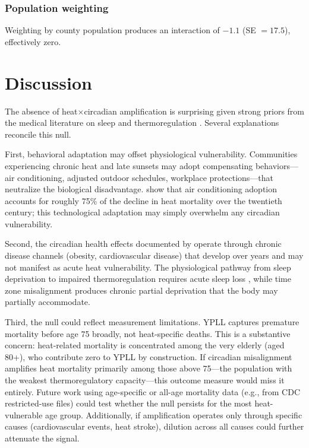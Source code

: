 \documentclass[12pt]{article}
\begin{document}
\subsubsection*{Population weighting} Weighting by county population produces an interaction of $-1.1$ (SE $= 17.5$), effectively zero.


\section{Discussion}
\label{sec:discussion}

The absence of heat$\times$circadian amplification is surprising given strong priors from the medical literature on sleep and thermoregulation \citep{lack2008sleep, okamoto2012effects}. Several explanations reconcile this null.

First, behavioral adaptation may offset physiological vulnerability. Communities experiencing chronic heat and late sunsets may adopt compensating behaviors---air conditioning, adjusted outdoor schedules, workplace protections---that neutralize the biological disadvantage. \citet{barreca2016adapting} show that air conditioning adoption accounts for roughly 75\% of the decline in heat mortality over the twentieth century; this technological adaptation may simply overwhelm any circadian vulnerability.

Second, the circadian health effects documented by \citet{giuntella2019sunset} operate through chronic disease channels (obesity, cardiovascular disease) that develop over years and may not manifest as acute heat vulnerability. The physiological pathway from sleep deprivation to impaired thermoregulation requires acute sleep loss \citep{okamoto2012effects}, while time zone misalignment produces chronic partial deprivation that the body may partially accommodate.

Third, the null could reflect measurement limitations. YPLL captures premature mortality before age 75 broadly, not heat-specific deaths. This is a substantive concern: heat-related mortality is concentrated among the very elderly (aged 80+), who contribute zero to YPLL by construction. If circadian misalignment amplifies heat mortality primarily among those above 75---the population with the weakest thermoregulatory capacity---this outcome measure would miss it entirely. Future work using age-specific or all-age mortality data (e.g., from CDC restricted-use files) could test whether the null persists for the most heat-vulnerable age group. Additionally, if amplification operates only through specific causes (cardiovascular events, heat stroke), dilution across all causes could further attenuate the signal.
\end{document}
